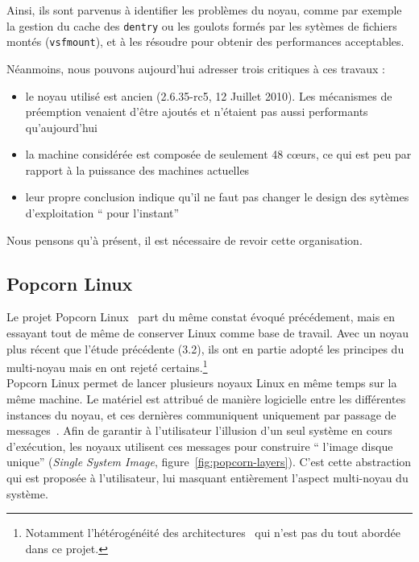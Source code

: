       Ainsi, ils sont parvenus à identifier les problèmes du noyau, comme par
      exemple la gestion du cache des \texttt{dentry} ou les goulots formés par
      les sytèmes de fichiers montés (\texttt{vsfmount}), et à les résoudre pour
      obtenir des performances acceptables.

      Néanmoins, nous pouvons aujourd’hui adresser trois critiques à ces travaux
      :
      \begin{itemize}
        \item le noyau utilisé est ancien (2.6.35-rc5, 12 Juillet 2010). Les
          mécanismes de préemption venaient d’être ajoutés et n’étaient pas
          aussi performants qu'aujourd'hui
        \item la machine considérée est composée de seulement 48 c\oe urs, ce qui
          est peu par rapport à la puissance des machines actuelles
        \item leur propre conclusion indique qu’il ne faut pas changer le design
          des sytèmes d’exploitation `` pour l’instant''\\
      \end{itemize}
      Nous pensons qu’à présent, il est nécessaire de revoir cette organisation.

      
    \subsection{Popcorn Linux}

      Le projet Popcorn Linux~\citep{barbalacepopcorn} part du même constat
      évoqué précédement, mais en essayant tout de même de conserver Linux comme
      base de travail. Avec un noyau plus récent que l'étude précédente (3.2),
      ils ont en partie adopté les principes du multi-noyau mais en ont rejeté
      certains.\footnote{Notamment l'hétérogénéité des
        architectures~\citep{schupbach2008embracing} qui n'est pas du tout
        abordée dans ce projet.}\\

      Popcorn Linux permet de lancer plusieurs noyaux Linux en même temps sur la
      même machine. Le matériel est attribué de manière logicielle entre les
      différentes instances du noyau, et ces dernières communiquent uniquement
      par passage de messages~\citep{shelton2013popcorn}. Afin de garantir à
      l’utilisateur l’illusion d’un seul système en cours d'exécution, les
      noyaux utilisent ces messages pour construire `` l’image disque unique''
      (\textit{Single System Image}, figure~\ref{fig:popcorn-layers}). C'est
      cette abstraction qui est proposée à l'utilisateur, lui masquant
      entièrement l'aspect multi-noyau du système.

